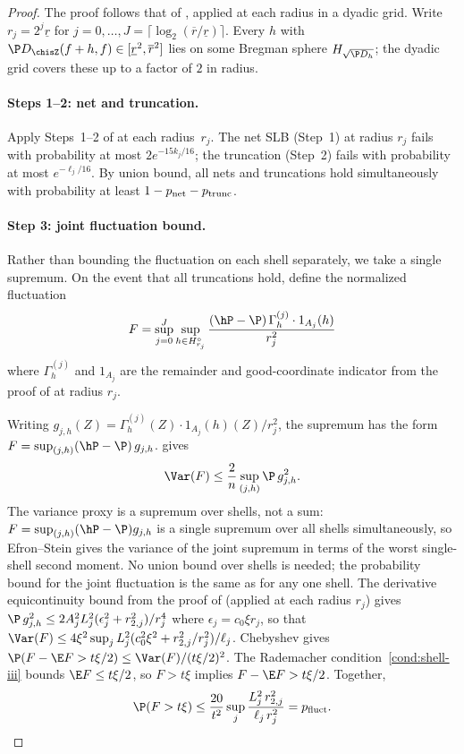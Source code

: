 \documentclass{article}
\begin{document}
\begin{proof}
The proof follows that of
,
applied at each radius in a dyadic grid.
Write $r_j = 2^j \underline{r}$ for
$j = 0, \ldots, J = \lceil \log_2(\overline{r}/\underline{r}) \rceil$.
Every $h$ with $\P D_{\chisZ}(f+h,f) \in [\underline{r}^2, \overline{r}^2]$
lies on some Bregman sphere $H_{\sqrt{\P D_h}}$;
the dyadic grid covers these
up to a factor of $2$ in radius.

\paragraph{Steps 1--2: net and truncation.}
Apply Steps~1--2 of 
at each radius~$r_j$.
The net SLB (Step~1) at radius $r_j$
fails with probability at most $2e^{-15k_j/16}$;
the truncation (Step~2) fails with probability
at most $e^{-\ell_j/16}$.
By union bound, all nets and truncations
hold simultaneously with probability
at least $1 - p_{\textup{net}} - p_{\textup{trunc}}$.

\paragraph{Step 3: joint fluctuation bound.}
Rather than bounding the fluctuation
on each shell separately,
we take a single supremum.
On the event that all truncations hold,
define the normalized fluctuation
\[
  F = \sup_{j=0}^{J}
      \sup_{h \in H_{r_j}^\circ}
      \frac{(\hP - \P)\,
        \Gamma_h^{(j)} \cdot 1_{A_j}(h)}{r_j^2}
\]
where $\Gamma_h^{(j)}$ and $1_{A_j}$
are the remainder and good-coordinate indicator
from the proof of 
at radius $r_j$.

Writing
$g_{j,h}(Z)
  = \Gamma_h^{(j)}(Z) \cdot 1_{A_j}(h)(Z) / r_j^2$,
the supremum has the form
$F = \sup_{(j,h)} (\hP - \P)\, g_{j,h}$.
 gives
\[
  \Var(F) \le \frac{2}{n}
    \sup_{(j,h)} \P\, g_{j,h}^2.
\]
The variance proxy is a supremum over shells,
not a sum:
$F = \sup_{(j,h)}(\hP - \P) g_{j,h}$
is a single supremum
over all shells simultaneously,
so Efron--Stein gives the variance
of the joint supremum
in terms of the worst single-shell
second moment.
No union bound over shells is needed;
the probability bound
for the joint fluctuation
is the same as for any one shell.
The derivative equicontinuity bound
from the proof of 
(applied at each radius $r_j$)
gives
$\P\, g_{j,h}^2
  \le 2A_j^2 L_j^2
    (\epsilon_j^2 + r_{2,j}^2) / r_j^4$
where $\epsilon_j = c_0\xi r_j$,
so that
$\Var(F)
  \le 4\xi^2
    \sup_j L_j^2
      (c_0^2\xi^2 + r_{2,j}^2/r_j^2) / \ell_j$.
Chebyshev gives
$\P(F - \E F > t\xi/2)
  \le \Var(F)/(t\xi/2)^2$.
The Rademacher condition~\ref{cond:shell-iii}
bounds $\E F \le t\xi/2$,
so $F > t\xi$ implies $F - \E F > t\xi/2$.
Together,
\[
  \P(F > t\xi)
    \le \frac{20}{t^2}
      \sup_j
      \frac{L_j^2\, r_{2,j}^2}{\ell_j\, r_j^2}
    = p_{\textup{fluct}}.
\]


\end{proof}
\end{document}
